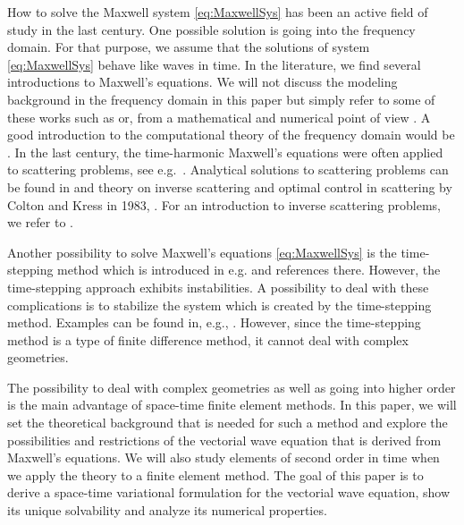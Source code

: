 \documentclass[a4paper,11pt]{article}
\begin{document}
How to solve the Maxwell system \eqref{eq:MaxwellSys} has been an active field of study in the last century. One possible solution is going into the frequency domain. For that purpose, we assume that the solutions of system \eqref{eq:MaxwellSys} behave like waves in time. In the literature, we find several introductions to Maxwell's equations. We will not discuss the modeling background in the frequency domain in this paper but simply refer to some of these works such as  \cite{Serdyukov,landauelectrodynamics} or, from a mathematical and numerical point of view \cite{Monk,cessenat1996mathematical}. 
A good introduction to the computational theory of the frequency domain would be \cite{Monk,umashankar1989introduction}. In the last century, the time-harmonic Maxwell's equations were often applied to scattering problems, see e.g.~\cite{jackson1998classical}. Analytical solutions to scattering problems can be found in \cite{poggio1970integral} and theory on inverse scattering and optimal control in scattering by Colton and Kress in 1983, \cite{colton1983integral}. For an introduction to inverse scattering problems, we refer to \cite{coltoninverse}.

Another possibility to solve Maxwell's equations \eqref{eq:MaxwellSys} is the time-stepping method which is introduced in e.g. \cite[Ch.~12.2]{Jin} and references there. However,  the time-stepping approach {exhibits} instabilities. 	A possibility to deal with these complications is to stabilize the system which is created by the time-stepping method. Examples can be found in, e.g., \cite{bai2022second,XIE2021109896,crawford2020unconditionally}. However, since the time-stepping method is a type of finite difference method, it cannot deal with complex geometries.

The possibility to deal with complex geometries as well as going into higher order is the main advantage of space-time finite element methods. In this paper, we will set the theoretical background that is needed for such a method and explore the possibilities and restrictions of the vectorial wave equation that is derived from Maxwell's equations. We will also study elements of second order in time when we apply the theory to a finite element method. The goal of this paper is to derive a space-time variational formulation for the vectorial wave equation, show its unique solvability and analyze its numerical properties. 
\end{document}
